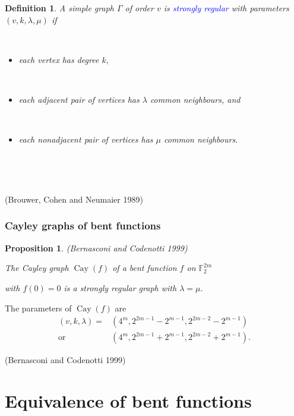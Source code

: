 \documentclass[pdf,sprung,slideColor,nocolorBG]{beamer}
\newenvironment{colortheme}[1]{
\def\ProvidesPackageRCS $##1${\relax}
\renewcommand{\ProcessOptions}{\relax}
\makeatletter

\makeatother
}{}
\newcommand{\slidecite}[1]{\tiny{(#1)}\normalsize{}}
\newcommand{\smallcite}[1]{\small{(#1)}\normalsize{}}
\newcommand{\mb}[1]{\mathbb{#1}}
\newcommand{\Emph}[1]{\emph{\textcolor{blue}{#1}}}
\newcommand{\Cay}[1]{\operatorname{Cay}\left(#1\right)}
\newcommand{\F}{\mb{F}}
\newtheorem{Def}{Definition}
\newtheorem{Proposition}{Proposition}
\begin{document}
\begin{colortheme}{seagull}
\begin{frame}
\begin{Def}
A simple graph $\Gamma$ of order $v$ is \Emph{strongly regular} with parameters
$(v,k,\lambda,\mu)$ if

~

\begin{itemize}
 \item
each vertex has degree $k,$

~
 \item
each adjacent pair of vertices has $\lambda$ common neighbours, and

~
\item
each nonadjacent pair of vertices has $\mu$ common neighbours.
\end{itemize}

\end{Def}

~

~

\slidecite{Brouwer, Cohen and Neumaier 1989}

\end{frame}

\begin{frame}
\frametitle{Cayley graphs of bent functions}

\begin{Proposition}
\smallcite{Bernasconi and Codenotti 1999}

The Cayley graph $\Cay{f}$ of a bent function $f$ on $\F_2^{2m}$

with $f(0)=0$ is a strongly regular graph with $\lambda = \mu.$
\end{Proposition}

The parameters of $\Cay{f}$ are
\begin{align*}
(v,k,\lambda) = &(4^m, 2^{2 m - 1} - 2^{m-1}, 2^{2 m - 2} - 2^{m-1})
\\
  \text{or} \quad &(4^m, 2^{2 m - 1} + 2^{m-1}, 2^{2 m - 2} + 2^{m-1}).
\end{align*}

\slidecite{Bernasconi and Codenotti 1999}
\end{frame}

\end{colortheme}

\section{Equivalence of bent functions}
\end{document}
